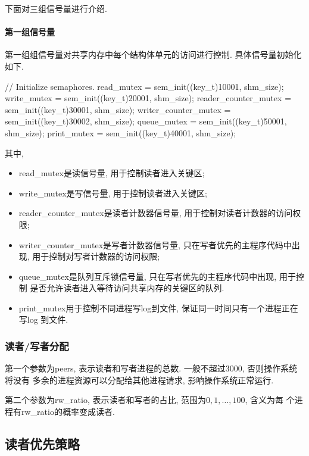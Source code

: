 下面对三组信号量进行介绍.

\paragraph{第一组信号量}
第一组组信号量对共享内存中每个结构体单元的访问进行控制. 具体信号量初始化如下.
\begin{code}
    // Initialize semaphores.
    read_mutex = sem_init((key_t)10001, shm_size);
    write_mutex = sem_init((key_t)20001, shm_size);
    reader_counter_mutex = sem_init((key_t)30001, shm_size);
    writer_counter_mutex = sem_init((key_t)30002, shm_size);
    queue_mutex = sem_init((key_t)50001, shm_size);
    print_mutex = sem_init((key_t)40001, shm_size);
\end{code}
其中,
\begin{itemize}
    \item read\_mutex是读信号量, 用于控制读者进入关键区;
    \item  write\_mutex是写信号量, 用于控制读者进入关键区;
    \item  reader\_counter\_mutex是读者计数器信号量, 用于控制对读者计数器的访问权限;
    \item writer\_counter\_mutex是写者计数器信号量, 只在写者优先的主程序代码中出现,
          用于控制对写者计数器的访问权限;
    \item queue\_mutex是队列互斥锁信号量, 只在写者优先的主程序代码中出现, 用于控制
          是否允许读者进入等待访问共享内存的关键区的队列.
    \item print\_mutex用于控制不同进程写log到文件, 保证同一时间只有一个进程正在写log
          到文件.
\end{itemize}

\subsubsection{读者/写者分配}
第一个参数为peers, 表示读者和写者进程的总数. 一般不超过3000, 否则操作系统将没有
多余的进程资源可以分配给其他进程请求, 影响操作系统正常运行.\par

第二个参数为rw\_ratio, 表示读者和写者的占比, 范围为$0, 1, \dots, 100$, 含义为每
个进程有rw\_ratio的概率变成读者.\par

\subsection{读者优先策略}
